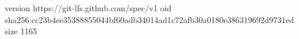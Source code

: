 version https://git-lfs.github.com/spec/v1
oid sha256:cc23b4ee35388855044bf60adb34014ad1c72afb30a0180e386319692d9731ed
size 1165
